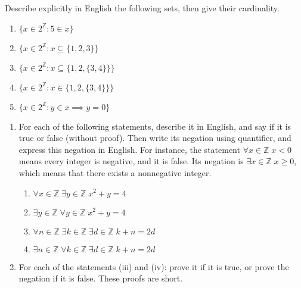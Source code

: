 \documentclass{article}
\newcommand{\Z}{\mathbb{Z}}
\theoremstyle{definition}
\begin{document}
\begin{question}
Describe explicitly in English the following sets, then give their cardinality.

\begin{enumerate}
	\item $\{x \in 2^{\Z} : 5 \in x \}$
	\item $\{x \in 2^{\Z} : x \subseteq \{ 1, 2, 3\} \}$
	\item $\{x \in 2^{\Z} : x \subseteq \{ 1, 2, \{3, 4\} \} \}$
	\item $\{x \in 2^{\Z} : x \in \{ 1, 2, \{3, 4\} \} \}$
	\item $\{x \in 2^{\Z} : y \in x \implies y = 0 \}$
\end{enumerate}
\end{question}
\begin{solution}
\end{solution}


\begin{question}
\begin{enumerate}
	\item For each of the following statements, describe it in English, and say if it is true or false (without proof). Then write its negation using quantifier, and express this negation in English. For instance, the statement $\forall x \in \Z \; x < 0$ means every integer is negative, and it is false. Its negation is $\exists x \in \Z \; x \geq 0$, which means that there exists a nonnegative integer.
	
	\begin{enumerate}
		\item $\forall x \in \Z \; \exists y \in \Z \; x^2 + y = 4$
		\item $\exists y \in \Z \; \forall y \in \Z \; x^2 + y = 4$
		\item $\forall n \in \Z \; \exists k \in \Z \; \exists d \in \Z \; k+ n = 2d$
		\item $\exists n \in \Z \; \forall k \in \Z \; \exists d \in \Z \; k+ n = 2d$
	\end{enumerate}
	
	\item For each of the statements (iii) and (iv): prove it if it is true, or prove the negation if it is false. These proofs are short.
\end{enumerate}
\end{question}
\begin{solution}
\end{solution}
\end{document}
